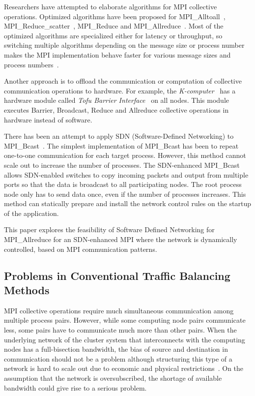 Researchers have attempted to elaborate algorithms for MPI collective
operations. Optimized algorithms have been proposed for
MPI\_Alltoall~\autocite{Bruck1997}, MPI\_Reduce\_scatter~\autocite{Iannello1997},
MPI\_Reduce and MPI\_Allreduce~\autocite{Rabenseifner1997}. Most of the optimized
algorithms are specialized either for latency or throughput, so switching
multiple algorithms depending on the message size or process number makes the
MPI implementation behave faster for various message sizes and process
numbers~\autocite{Thakur2005}.

Another approach is to offload the communication or computation of
collective communication operations to hardware. For example, the
\emph{K-computer}~\autocite{Yokokawa2011} has a hardware module called \emph{Tofu
Barrier Interface}~\autocite{Ajima2012} on all nodes. This module executes
Barrier, Broadcast, Reduce and Allreduce collective operations in hardware
instead of software.

There has been an attempt to apply SDN (Software-Defined Networking) to
MPI\_Bcast~\autocite{Dashdavaa2013}. The simplest implementation of MPI\_Bcast has
been to repeat one-to-one communication for each target process. However, this
method cannot scale out to increase the number of processes. The SDN-enhanced
MPI\_Bcast allows SDN-enabled switches to copy incoming packets and output
from multiple ports so that the data is broadcast to all participating nodes.
The root process node only has to send data once, even if the number of
processes increases. This method can statically prepare and install the
network control rules on the startup of the application.

This paper explores the feasibility of Software Defined Networking for
MPI\_Allreduce for an SDN-enhanced MPI where the network is dynamically
controlled, based on MPI communication patterns.

\subsection{Problems in Conventional Traffic Balancing Methods}

MPI collective operations require much simultaneous communication among
multiple process pairs. However, while some computing node pairs
communicate less, some pairs have to communicate much more than other
pairs. When the underlying network of the cluster system that
interconnects with the computing nodes has a full-bisection bandwidth,
the bias of source and destination in communication should not be a
problem although structuring this type of a network is hard to scale out
due to economic and physical restrictions~\autocite{Al-Fares2008}. On the
assumption that the network is oversubscribed, the shortage of available
bandwidth could give rise to a serious problem.

